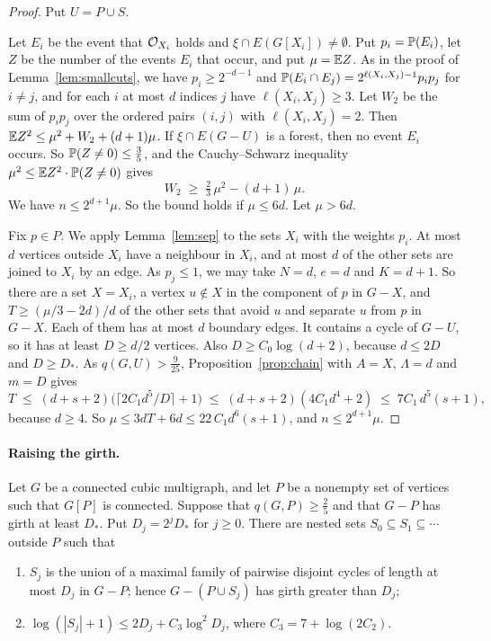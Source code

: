 \begin{proof}
Put $U=P\cup S$.

 Let $E_i$ be the event that $\mathcal{O}_{X_i}$ holds and
$\xi\cap E(G[X_i])\ne\emptyset$. Put $p_i=\mathbb{P}(E_i)$, let $Z$ be the number of the events $E_i$
that occur, and put $\mu=\mathbb{E} Z$. As in the proof of Lemma~\ref{lem:smallcuts}, we have
$p_i\ge2^{-d-1}$ and $\mathbb{P}(E_i\cap E_j)=2^{\ell(X_i,X_j)-1}p_ip_j$ for $i\ne j$, and for each $i$
at most $d$ indices $j$ have $\ell(X_i,X_j)\ge3$. Let $W_2$ be the sum of $p_ip_j$ over the
ordered pairs $(i,j)$ with $\ell(X_i,X_j)=2$. Then $\mathbb{E} Z^{2}\le\mu^{2}+W_2+(d+1)\mu$. If
$\xi\cap E(G-U)$ is a forest, then no event $E_i$ occurs. So $\mathbb{P}(Z\ne0)\le\frac35$, and the
Cauchy--Schwarz inequality $\mu^{2}\le\mathbb{E} Z^{2}\cdot\mathbb{P}(Z\ne0)$ gives
\[
  W_2\;\ge\;\tfrac23\,\mu^{2}-(d+1)\,\mu .
\]
We have $n\le2^{d+1}\mu$. So the bound holds if $\mu\le6d$. Let $\mu>6d$.

 Fix $p\in P$. We apply Lemma~\ref{lem:sep} to the sets $X_i$ with the weights
$p_i$. At most $d$ vertices outside $X_i$ have a neighbour in $X_i$, and at most $d$ of the other
sets are joined to $X_i$ by an edge. As $p_j\le1$, we may take $N=d$, $e=d$ and $K=d+1$. So
there are a set $X=X_i$, a vertex $u\notin X$ in the component of $p$ in $G-X$, and
$T\ge(\mu/3-2d)/d$ of the other sets that avoid $u$ and separate $u$ from $p$ in $G-X$. Each of
them has at most $d$ boundary edges. It contains a cycle of $G-U$, so it has at least
$D\ge d/2$ vertices. Also $D\ge C_0\log(d+2)$, because $d\le2D$ and $D\ge D_*$. As
$q(G,U)>\frac9{25}$, Proposition~\ref{prop:chain} with $A=X$, $\Lambda=d$ and $m=D$ gives
\[
  T\;\le\;(d+s+2)\bigl(\lceil2C_1d^{5}/D\rceil+1\bigr)\;\le\;(d+s+2)(4C_1d^{4}+2)
  \;\le\;7C_1\,d^{5}(s+1),
\]
because $d\ge4$. So $\mu\le3dT+6d\le22\,C_1d^{6}(s+1)$, and $n\le2^{d+1}\mu$.
\end{proof}

\paragraph{Raising the girth.}

\begin{theorem}\label{thm:raise}
Let $G$ be a connected cubic multigraph, and let $P$ be a nonempty set of vertices such that
$G[P]$ is connected. Suppose that $q(G,P)\ge\frac25$ and that $G-P$ has girth at least $D_*$. Put
$D_j=2^jD_*$ for $j\ge0$. There are nested sets $S_0\subseteq S_1\subseteq\cdots$ outside $P$
such that
\begin{enumerate}
\item[\textup{(i)}] $S_j$ is the union of a maximal family of pairwise disjoint cycles of length
at most $D_j$ in $G-P$; hence $G-(P\cup S_j)$ has girth greater than $D_j$;
\item[\textup{(ii)}] $\log(|S_j|+1)\le2D_j+C_3\log^{2}D_j$, where $C_3=7+\log(2C_2)$.
\end{enumerate}
\end{theorem}

